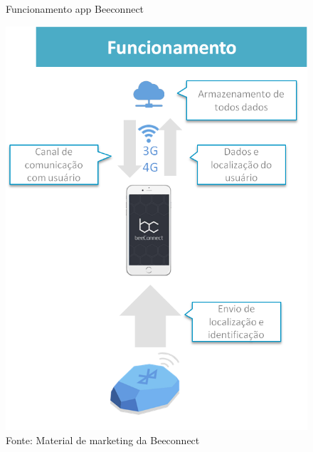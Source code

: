 \begin{figure}[H]
\caption{Funcionamento app Beeconnect}
\centerline{\includegraphics[scale=0.75]{img/explicacaoBeeconnect}}
\label{fig:explicacaoBeeconnect}
\caption* {Fonte: Material de marketing da Beeconnect}
\end{figure}

